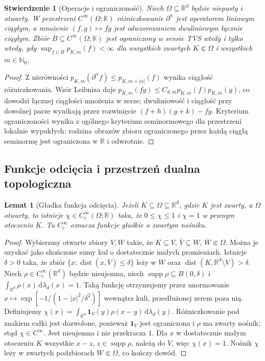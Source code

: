 \documentclass[11pt,a4paper]{article}
\numberwithin{equation}{section}
\theoremstyle{plain}
\newtheorem{stwierdzenie}[twierdzenie]{Stwierdzenie}
\newtheorem{lemat}[twierdzenie]{Lemat}
\theoremstyle{definition}
\theoremstyle{remark}
\newcommand{\R}{\mathbb R}
\newcommand{\N}{\mathbb N}
\newcommand{\K}{\mathbb K}
\begin{document}
\begin{stwierdzenie}[Operacje i ograniczoność]
\label{prop:operations-cinf17}
Niech $\Omega\subseteq\R^d$ będzie niepusty i otwarty.
W przestrzeni $C^\infty(\Omega;\K)$ różniczkowanie
$\partial^\alpha$ jest operatorem liniowym ciągłym,
a mnożenie $(f,g)\mapsto fg$ jest odwzorowaniem dwuliniowym
łącznie ciągłym. Zbiór $B\subseteq C^\infty(\Omega;\K)$
jest ograniczony w sensie TVS wtedy i tylko wtedy, gdy
$\sup_{f\in B}p_{K,m}(f)<\infty$ dla wszystkich zwartych
$K\Subset\Omega$ i wszystkich $m\in\N_0$.
\end{stwierdzenie}
\begin{proof}
Z nierówności $p_{K,m}(\partial^\alpha f)\le p_{K,m+|\alpha|}(f)$
wynika ciągłość różniczkowania. Wzór Leibniza daje
$p_{K,m}(fg)\le C_{d,m}p_{K,m}(f)p_{K,m}(g)$,
co dowodzi łącznej ciągłości mnożenia w zerze;
dwuliniowość i ciągłość przy dowolnej parze wynikają przez
rozwinięcie $(f+h)(g+k)-fg$. Kryterium ograniczoności
wynika z ogólnego kryterium seminormowego dla przestrzeni
lokalnie wypukłych: rodzina obrazów zbioru ograniczonego przez
każdą ciągłą seminormę jest ograniczona w $\R$ i odwrotnie.
\end{proof}

\subsection{Funkcje odcięcia i przestrzeń dualna topologiczna}

\begin{lemat}[Gładka funkcja odcięcia]
\label{lem:cutoffs17}
Jeżeli $K\subseteq\Omega\subseteq\R^d$, gdzie $K$ jest zwarty,
a $\Omega$ otwarty, to istnieje $\chi\in C_c^\infty(\Omega;\R)$
taka, że $0\le\chi\le1$ i $\chi=1$ w pewnym otoczeniu $K$.
Tu $C_c^\infty$ oznacza funkcje gładkie o zwartym nośniku.
\end{lemat}
\begin{proof}
Wybierzmy otwarte zbiory $V,W$ takie, że
$K\subseteq V$, $\overline V\subseteq W$, $\overline W\Subset\Omega$.
Można je uzyskać jako skończone sumy kul o dostatecznie małych
promieniach. Istnieje $\delta>0$ taka, że zbiór
$\{x:\operatorname{dist}(x,\overline V)\le\delta\}$
leży w $W$ oraz $\operatorname{dist}(K,\R^d\setminus V)>\delta$.
Niech $\rho\in C_c^\infty(\R^d)$ będzie nieujemna,
niech $\operatorname{supp}\rho\subseteq B(0,\delta)$ i
$\int_{\R^d}\rho(x)\,\mathrm d\lambda_d(x)=1$.
Taką funkcję otrzymujemy przez unormowanie
$x\mapsto\exp[-1/(1-|x|^2/\delta^2)]$ wewnątrz kuli,
przedłużonej zerem poza nią.
Definiujemy $\chi(x)=\int_{\R^d}\mathbf1_V(y)\rho(x-y)\,\mathrm d\lambda_d(y)$.
Różniczkowanie pod znakiem całki jest dozwolone, ponieważ
$\mathbf1_V$ jest ograniczona i $\rho$ ma zwarty nośnik;
stąd $\chi\in C^\infty$. Jest nieujemna i nie przekracza $1$.
Dla $x$ w dostatecznie małym otoczeniu $K$ wszystkie
$x-z$, $z\in\operatorname{supp}\rho$, należą do $V$,
więc $\chi(x)=1$. Nośnik $\chi$ leży w zwartych
podzbiorach $W\Subset\Omega$, co kończy dowód.
\end{proof}
\end{document}
